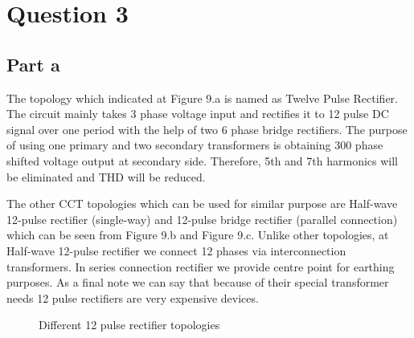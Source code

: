 \documentclass[fleqn, a4paper]{report}
\begin{document}
\section*{Question 3}
\subsection*{Part a}
The topology which indicated at Figure 9.a is named as Twelve Pulse Rectifier. The circuit mainly takes 3 phase voltage input and rectifies it to 12 pulse DC signal over one period with the help of two 6 phase bridge rectifiers. The purpose of using one primary and two secondary transformers is obtaining 300 phase shifted voltage output at secondary side. Therefore, 5th and 7th harmonics will be eliminated and THD will be reduced.

The other CCT topologies which can be used for similar purpose are Half-wave 12-pulse rectifier (single-way) and 12-pulse bridge rectifier (parallel connection) which can be seen from Figure 9.b and Figure 9.c. Unlike other topologies, at Half-wave 12-pulse rectifier we connect 12 phases via interconnection transformers. In series connection rectifier we provide centre point for earthing purposes. As a final note we can say that because of their special transformer needs 12 pulse rectifiers are very expensive devices.
\begin{figure}[H]%
    \centering
    \qquad
    \qquad
    \caption{Different 12 pulse rectifier topologies}%
    \label{fig:example}%
\end{figure}
\end{document}
